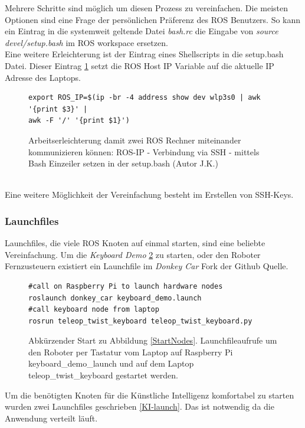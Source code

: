 \documentclass[conference]{IEEEtran}
\begin{document}
	Mehrere Schritte sind möglich um diesen Prozess zu vereinfachen. Die 
	meisten Optionen sind eine Frage der persönlichen Präferenz des ROS 
	Benutzers. So kann ein Eintrag in die systemweit geltende Datei 
	\textit{bash.rc} die Eingabe von \textit{source devel/setup.bash} im ROS 
	workspace ersetzen. \\
	Eine weitere Erleichterung ist der Eintrag eines Shellscripts in die 
	setup.bash Datei. Dieser Eintrag \ref{Einzeiler} setzt die ROS Host IP 
	Variable auf die aktuelle IP Adresse des Laptops.
	\begin{figure}
		\centering
\begin{verbatim}
export ROS_IP=$(ip -br -4 address show dev wlp3s0 | awk '{print $3}' | 
awk -F '/' '{print $1}')
\end{verbatim}
		\label{Einzeiler}
		\caption{Arbeitserleichterung damit zwei ROS Rechner miteinander 
		kommunizieren können: ROS-IP - Verbindung via SSH - mittels Bash 
		Einzeiler setzen  in der setup.bash (Autor J.K.)}
	\end{figure}
	\\
	Eine weitere Möglichkeit der Vereinfachung besteht im Erstellen von 
	SSH-Keys. 
	
	\subsubsection{Launchfiles}
	
	Launchfiles, die viele ROS Knoten auf einmal starten, sind eine beliebte 
	Vereinfachung. Um die \textit{Keyboard Demo} \ref{demo} zu starten, oder 
	den Roboter Fernzusteuern existiert ein Launchfile im \textit{Donkey Car} 
	Fork der Github Quelle.
	\begin{figure}
		\centering
\begin{verbatim}
#call on Raspberry Pi to launch hardware nodes
roslaunch donkey_car keyboard_demo.launch
#call keyboard node from laptop 
rosrun teleop_twist_keyboard teleop_twist_keyboard.py
\end{verbatim}
\label{demo}
\caption{Abkürzender Start zu Abbildung \ref{StartNodes}. Launchfileaufrufe um den Roboter per Tastatur vom Laptop auf 
 Raspberry Pi keyboard\_demo\_launch und auf dem Laptop 
 teleop\_twist\_keyboard gestartet werden.}

	\end{figure}
	
	Um die benötigten Knoten für die Künstliche Intelligenz komfortabel zu 
	starten wurden zwei Launchfiles geschrieben \ref{KI-launch}. Das ist 
	notwendig da die Anwendung verteilt läuft.
	
\end{document}
